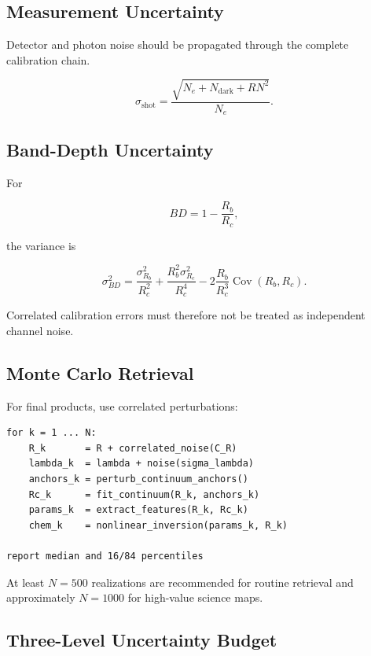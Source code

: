\documentclass[11pt,a4paper]{article}
\begin{document}
\subsection{Measurement Uncertainty}

Detector and photon noise should be propagated through the complete calibration chain.

\begin{equation}
\sigma_{\mathrm{shot}}
=
\frac{
\sqrt{
N_e+N_{\mathrm{dark}}+RN^2
}
}{
N_e
}.
\end{equation}

\subsection{Band-Depth Uncertainty}

For

\begin{equation}
BD=1-\frac{R_b}{R_c},
\end{equation}

the variance is

\begin{equation}
\sigma_{BD}^2
=
\frac{\sigma_{R_b}^2}{R_c^2}
+
\frac{R_b^2\sigma_{R_c}^2}{R_c^4}
-
2\frac{R_b}{R_c^3}
\operatorname{Cov}(R_b,R_c).
\end{equation}

Correlated calibration errors must therefore not be treated as independent channel noise.

\subsection{Monte Carlo Retrieval}

For final products, use correlated perturbations:

\begin{lstlisting}
for k = 1 ... N:
    R_k       = R + correlated_noise(C_R)
    lambda_k  = lambda + noise(sigma_lambda)
    anchors_k = perturb_continuum_anchors()
    Rc_k      = fit_continuum(R_k, anchors_k)
    params_k  = extract_features(R_k, Rc_k)
    chem_k    = nonlinear_inversion(params_k, R_k)

report median and 16/84 percentiles
\end{lstlisting}

At least $N=500$ realizations are recommended for routine retrieval and approximately $N=1000$ for high-value science maps.

\subsection{Three-Level Uncertainty Budget}
\end{document}
